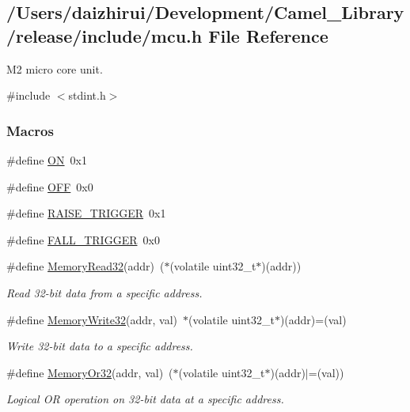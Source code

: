 \hypertarget{a00020}{}\subsection{/\+Users/daizhirui/\+Development/\+Camel\+\_\+\+Library/release/include/mcu.h File Reference}
\label{a00020}


M2 micro core unit.  


{\ttfamily \#include $<$stdint.\+h$>$}\newline
\subsubsection*{Macros}
\begin{DoxyCompactItemize}
\item 
\#define \mbox{\hyperlink{a00020_ad76d1750a6cdeebd506bfcd6752554d2}{ON}}~0x1
\item 
\#define \mbox{\hyperlink{a00020_a29e413f6725b2ba32d165ffaa35b01e5}{O\+FF}}~0x0
\item 
\#define \mbox{\hyperlink{a00020_abda90eda34a640b130f48a6ade23fe22}{R\+A\+I\+S\+E\+\_\+\+T\+R\+I\+G\+G\+ER}}~0x1
\item 
\#define \mbox{\hyperlink{a00020_a9bbaf5b9e2125c7597249c7113b20e6c}{F\+A\+L\+L\+\_\+\+T\+R\+I\+G\+G\+ER}}~0x0
\item 
\#define \mbox{\hyperlink{a00020_a2d484dc15bdf30ee11ab3b05f31f0e16}{Memory\+Read32}}(addr)~($\ast$(volatile uint32\+\_\+t$\ast$)(addr))
\begin{DoxyCompactList}\small\item\em Read 32-\/bit data from a specific address. \end{DoxyCompactList}\item 
\#define \mbox{\hyperlink{a00020_a6b9732365b12e48ddb89fe1028b975b0}{Memory\+Write32}}(addr,  val)~$\ast$(volatile uint32\+\_\+t$\ast$)(addr)=(val)
\begin{DoxyCompactList}\small\item\em Write 32-\/bit data to a specific address. \end{DoxyCompactList}\item 
\#define \mbox{\hyperlink{a00020_a27874a97deab7cecdde5ddecf466e31e}{Memory\+Or32}}(addr,  val)~($\ast$(volatile uint32\+\_\+t$\ast$)(addr)$\vert$=(val))
\begin{DoxyCompactList}\small\item\em Logical OR operation on 32-\/bit data at a specific address. \end{DoxyCompactList}\item 

\end{DoxyCompactItemize}

